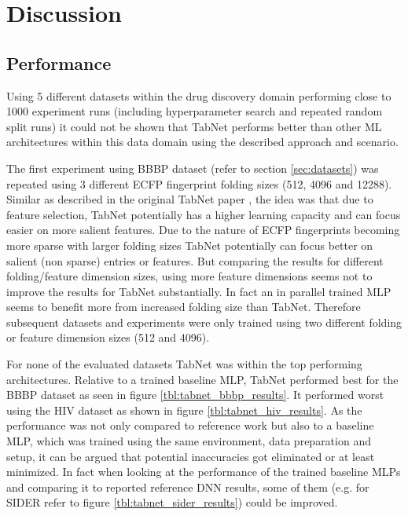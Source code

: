 \documentclass[../main.tex]{subfiles}
\begin{document}
\section{Discussion} \label{sec:discussion}

\subsection{Performance}

Using 5 different datasets within the drug discovery domain performing close to 1000 experiment runs (including hyperparameter search and repeated random split runs) it could not be shown that TabNet performs better than other ML architectures within this data domain using the described approach and scenario. 
\newline

The first experiment using BBBP dataset (refer to section \ref{sec:datasets}) was repeated using 3 different ECFP fingerprint folding sizes (512, 4096 and 12288). Similar as described in the original TabNet paper \cite{arik_tabnet_2020}, the idea was that due to feature selection, TabNet potentially has a higher learning capacity and can focus easier on more salient features. Due to the nature of ECFP fingerprints becoming more sparse with larger folding sizes TabNet potentially can focus better on salient (non sparse) entries or features. But comparing the results for different folding/feature dimension sizes, using more feature dimensions seems not to improve the results for TabNet substantially. In fact an in parallel trained MLP seems to benefit more from increased folding size than TabNet. Therefore subsequent datasets and experiments were only trained using two different folding or feature dimension sizes (512 and 4096). 
\newline

For none of the evaluated datasets TabNet was within the top performing architectures. Relative to a trained baseline MLP, TabNet performed best for the BBBP dataset as seen in figure \ref{tbl:tabnet_bbbp_results}. It performed worst using the HIV dataset as shown in figure \ref{tbl:tabnet_hiv_results}. As the performance was not only compared to reference work but also to a baseline MLP, which was trained using the same environment, data preparation and setup, it can be argued that potential inaccuracies got eliminated or at least minimized. In fact when looking at the performance of the trained baseline MLPs and comparing it to reported reference DNN results, some of them (e.g. for SIDER refer to figure \ref{tbl:tabnet_sider_results}) could be improved.
\end{document}
